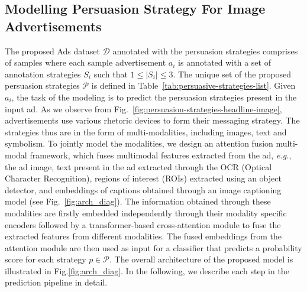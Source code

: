 \documentclass[hidelinks,11pt,a4paper]{report}
\begin{document}
\subsection{Modelling Persuasion Strategy For Image Advertisements}
The proposed Ads dataset $\mathcal{D}$ annotated with the persuasion strategies comprises of samples where each sample advertisement $a_i$ is annotated with a set of annotation strategies $S_i$ such that $1\le|{S_i}|\le3$. The unique set of the proposed persuasion strategies $\mathcal{P}$ is defined in Table~\ref{tab:persuasive-strategies-list}. Given $a_i$, the task of the modeling is to predict the persuasion strategies present in the input ad. As we observe from Fig.~\ref{fig:persuasion-strategies-headline-image}, advertisements use various rhetoric devices to form their messaging strategy. The strategies thus are in the form of multi-modalities, including images, text and symbolism. To jointly model the modalities, we design an attention fusion multi-modal framework, which fuses multimodal features extracted from the ad, {\it e.g.}, the ad image, text present in the ad extracted through the OCR (Optical Character Recognition), regions of interest (ROIs) extracted using an object detector, and embeddings of captions obtained through an image captioning model (see Fig.~\ref{fig:arch_diag}). The information obtained through these modalities are firstly embedded independently through their modality specific encoders followed by a transformer-based cross-attention module to fuse the extracted features from different modalities. The fused embeddings from the attention module are then used as input for a classifier that predicts a probability score for each strategy $p \in \mathcal{P}$. The overall architecture of the proposed model is illustrated in Fig.\ref{fig:arch_diag}. In the following, we describe each step in the prediction pipeline in detail.

\end{document}
